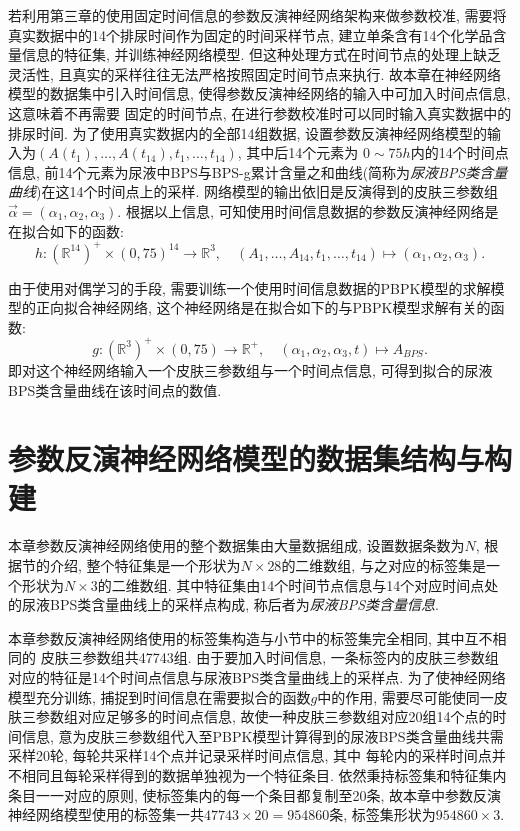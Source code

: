 \documentclass[a4paper,punct=banjiao,twoside]{ctexrep}
\theoremstyle{plain}
\theoremstyle{definition}
\theoremstyle{remark}
\begin{document}
若利用第三章的使用固定时间信息的参数反演神经网络架构来做参数校准, 需要将真实数据中的14个排尿时间作为固定的时间采样节点, 建立单条含有14个化学品含量信息的特征集, 并训练神经网络模型. 
但这种处理方式在时间节点的处理上缺乏灵活性, 且真实的采样往往无法严格按照固定时间节点来执行. 故本章在神经网络模型的数据集中引入时间信息, 使得参数反演神经网络的输入中可加入时间点信息, 这意味着不再需要
固定的时间节点, 在进行参数校准时可以同时输入真实数据中的排尿时间. 为了使用真实数据内的全部14组数据, 设置参数反演神经网络模型的输入为$(A(t_1),\dots,A(t_{14}),t_1,\dots,t_{14})$, 其中后14个元素为
$0\sim 75h$内的14个时间点信息, 前14个元素为尿液中BPS与BPS-g累计含量之和曲线(简称为\textit{尿液BPS类含量曲线})在这14个时间点上的采样. 网络模型的输出依旧是反演得到的皮肤三参数组
$\vec{\alpha} = (\alpha_1,\alpha_2,\alpha_3)$. 
根据以上信息, 可知使用时间信息数据的参数反演神经网络是在拟合如下的函数:
\begin{equation}
  \label{eq3.2}
  h:(\mathbb{R}^{14})^{+}\times (0,75)^{14} \to \mathbb{R}^{3},\quad (A_1,\dots,A_{14},t_1,\dots,t_{14})\mapsto (\alpha_1,\alpha_2,\alpha_3).
\end{equation}


由于使用对偶学习的手段, 需要训练一个使用时间信息数据的PBPK模型的求解模型的正向拟合神经网络, 这个神经网络是在拟合如下的与PBPK模型求解有关的函数:
\begin{equation}
\label{eq3.1}
g:(\mathbb{R}^3)^{+}\times (0,75) \to \mathbb{R}^{+},\quad (\alpha_1,\alpha_2,\alpha_3, t)\mapsto A_{BPS}.
\end{equation}
即对这个神经网络输入一个皮肤三参数组与一个时间点信息, 可得到拟合的尿液BPS类含量曲线在该时间点的数值. 


\section{参数反演神经网络模型的数据集结构与构建}
\label{4.2}
本章参数反演神经网络使用的整个数据集由大量数据组成, 设置数据条数为$N$, 根据\label{4.1}节的介绍, 整个特征集是一个形状为$N \times 28$的二维数组,  与之对应的标签集是一个形状为$N \times 3$的二维数组. 
其中特征集由14个时间节点信息与14个对应时间点处的尿液BPS类含量曲线上的采样点构成, 称后者为\textit{尿液BPS类含量信息}. 

本章参数反演神经网络使用的标签集构造与\label{3.2.1}小节中的标签集完全相同, 其中互不相同的
皮肤三参数组共47743组. 
由于要加入时间信息, 一条标签内的皮肤三参数组对应的特征是14个时间点信息与尿液BPS类含量曲线上的采样点.  为了使神经网络模型充分训练, 捕捉到时间信息在需要拟合的函数$g$中的作用, 
需要尽可能使同一皮肤三参数组对应足够多的时间点信息, 故使一种皮肤三参数组对应20组14个点的时间信息, 意为皮肤三参数组代入至PBPK模型计算得到的尿液BPS类含量曲线共需采样20轮, 每轮共采样14个点并记录采样时间点信息, 其中
每轮内的采样时间点并不相同且每轮采样得到的数据单独视为一个特征条目. 依然秉持标签集和特征集内条目一一对应的原则, 使标签集内的每一个条目都复制至20条, 故本章中参数反演神经网络模型使用的标签集一共$47743\times 20 = 954860$条, 
标签集形状为$954860\times 3$.
\end{document}
